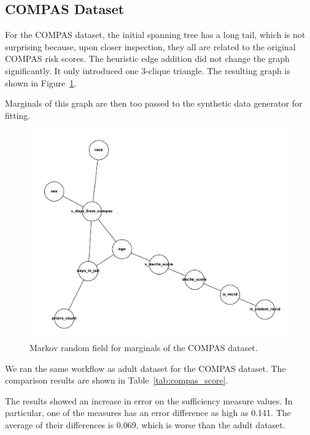 \documentclass[manuscript,screen,review,anonymous]{acmart}
\begin{document}
\subsection{COMPAS Dataset}

For the COMPAS dataset, the initial spanning tree has a long tail, which is not surprising because, upon closer inspection, they all are related to the original COMPAS risk scores. The heuristic edge addition did not change the graph significantly. It only introduced one 3-clique triangle. The resulting graph is shown in Figure~\ref{fig:compas_mst}.

Marginals of this graph are then too passed to the synthetic data generator for fitting.

\begin{figure}[h]
\centering
\includegraphics[width=\linewidth]{compas_mst}
\caption{Markov random field for marginals of the COMPAS dataset.}
\label{fig:compas_mst}
\end{figure}

We ran the same workflow as adult dataset for the COMPAS dataset. The comparison results are shown in Table~\ref{tab:compas_score}.

The results showed an increase in error on the sufficiency measure values. In particular, one of the measures has an error difference as high as 0.141. The average of their differences is 0.069, which is worse than the adult dataset.
\end{document}
